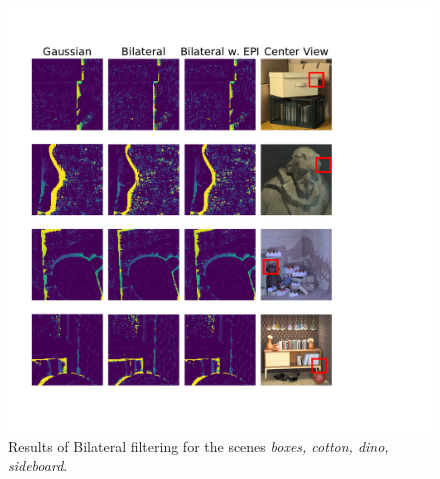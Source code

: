 \documentclass  [
  paper    = a4,
  BCOR     = 10mm,
  twoside,
  fontsize = 12pt,
  fleqn,
  toc      = bibnumbered,
  toc      = listofnumbered,
  numbers  = noendperiod,
  headings = normal,
  listof   = leveldown,
  version  = 3.03
]                                       {scrreprt}
\begin{document}
\begin{figure}
	\centering
	\includegraphics[width=1\linewidth]{images/bilat_results-eps-converted-to}
	\caption[Results of the bilateral filtering]{Results of Bilateral filtering for the scenes \textit{ boxes, cotton, dino, sideboard}.}
	\label{fig:bilatresults}
\end{figure}
\end{document}
